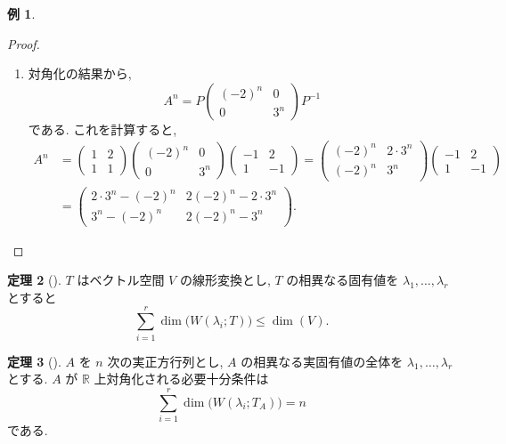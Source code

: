 \documentclass[dvipdfmx,a4paper,11pt]{article} %
\theoremstyle{definition}
\newtheorem{thm}{定理}[section]
\newtheorem{eg}[thm]{例}
\begin{document}
\begin{eg}
\begin{proof}
\begin{enumerate}
\item[手順4.]
対角化の結果から,
\[
A^n
=
P
\begin{pmatrix}
(-2)^n&0\\
0&3^n
\end{pmatrix}
P^{-1}
\]
である. これを計算すると,
\begin{align*}
A^n
&=
\begin{pmatrix}
1&2\\
1&1
\end{pmatrix}
\begin{pmatrix}
(-2)^n&0\\
0&3^n
\end{pmatrix}
\begin{pmatrix}
-1&2\\
1&-1
\end{pmatrix}
=
\begin{pmatrix}
(-2)^n&2\cdot 3^n\\
(-2)^n&3^n
\end{pmatrix}
\begin{pmatrix}
-1&2\\
1&-1
\end{pmatrix}
\\
&=
\begin{pmatrix}
2\cdot 3^n-(-2)^n
&
2(-2)^n-2\cdot 3^n
\\
3^n-(-2)^n
&
2(-2)^n-3^n
\end{pmatrix}.
\end{align*}
\end{enumerate}
\end{proof}
\end{eg}

\begin{thm}
[{\cite[定理5.4.1]{M}}]
\(T\) はベクトル空間 \(V\) の線形変換とし, \(T\) の相異なる固有値を
\(
\lambda_1,\ldots,\lambda_r
\)
とすると
\[
\sum_{i=1}^{r}\dim\bigl(W(\lambda_i;T)\bigr)
\leq \dim(V).
\]
\end{thm}

\begin{thm}
[{\cite[定理5.4.2]{M}}]
\(A\) を \(n\) 次の実正方行列とし, \(A\) の相異なる実固有値の全体を
\(
\lambda_1,\ldots,\lambda_r
\)
とする. \(A\) が \(\mathbb{R}\) 上対角化される必要十分条件は
\[
\sum_{i=1}^{r}\dim\bigl(W(\lambda_i;T_A)\bigr)=n
\]
である.
\end{thm}
\end{document}

